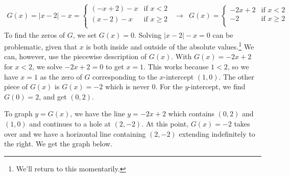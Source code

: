 \documentclass{ximera}
\begin{document}
\begin{example}
\begin{enumerate}
\begin{enumerate}
\[\begin{array}{ccc}
G(x) = |x - 2| - x =  \begin{cases} 
     (-x + 2) - x &  \text{if $x < 2$} \\
     (x - 2) - x  & \text{if $x \geq 2$} \\
   \end{cases} 
   
 &
 
 \longrightarrow
 
 &
 
G(x) =  \begin{cases} 
     -2x + 2 &  \text{if $x < 2$} \\
     -2 & \text{if $x \geq 2$} \\
   \end{cases}
   
   \end{array}  \] To find the zeros of $G$, we set $G(x) = 0$.  Solving $|x - 2| - x = 0$ can be problematic, given that $x$ is both inside and outside of the absolute values.\footnote{We'll return to this momentarily.}  We can, however, use the piecewise description of $G(x)$.  With $G(x) = -2x + 2$ for $x < 2$, we solve $-2x + 2 = 0$ to get $x = 1$. This works because $1 < 2$, so we have $x = 1$ as the zero of $G$ corresponding to the $x$-intercept $(1,0)$.  The other piece of $G(x)$ is $G(x) = -2$ which is never $0$.  For the $y$-intercept, we find $G(0) = 2$, and get $(0, 2)$.  
	
	
To graph $y = G(x)$, we have the line $y = -2x + 2$ which contains $(0, 2)$ and $(1, 0)$ and continues to a hole at $(2, -2)$.  At this point, $G(x) = -2$ takes over and we have a horizontal line containing $(2, -2)$ extending indefinitely to the right. We get the graph below.  

  \begin{image}
\end{image}
\end{enumerate}
\end{enumerate}
\end{example}
\end{document}
